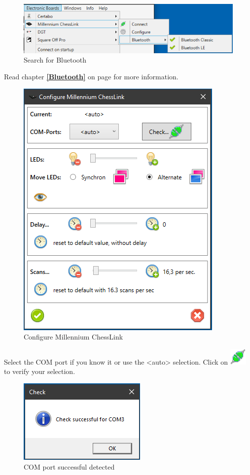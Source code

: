 \documentclass[11pt,a4paper]{article}
\begin{document}
\begin{figure}[H]
	\centering
	\includegraphics[scale=0.8]{MillenniumChessLink9.png}
	\caption{Search for Bluetooth }
	\label{fig:MillenniumChessLink9}
\end{figure}
Read chapter \textbf{\ref{Bluetooth}  } on page \pageref{Bluetooth} for more information.

\begin{figure}[H]
	\centering
	\includegraphics[scale=0.9]{MillenniumChessLink2.png}
	\caption{Configure Millennium ChessLink}
	\label{fig:MillenniumChessLink2}
\end{figure}

Select the COM port if you know it or use the <auto> selection.
Click on \includegraphics[scale=0.5]{connect.png} to verify your selection.

\begin{figure}[H]
	\centering
	\includegraphics[scale=1.0]{MillenniumChessLink3.png}
	\caption{COM port successful detected }
	\label{fig:MillenniumChessLink3}
\end{figure}
\end{document}
